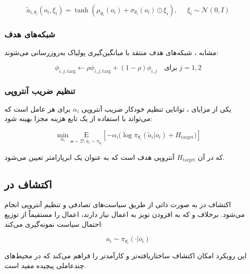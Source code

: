\begin{equation}
    \tilde{a}_{i,\theta_i}(o_i, \xi_i) = \tanh\left( \mu_{\theta_i}(o_i) + \sigma_{\theta_i}(o_i) \odot \xi_i \right), \;\;\;\;\; \xi_i \sim \mathcal{N}(0, I)
\end{equation}

\subsubsection{شبکه‌های هدف}

مشابه ، شبکه‌های هدف منتقد با میانگین‌گیری پولیاک به‌روزرسانی می‌شوند:

\begin{equation}
    \phi_{i,j,\text{targ}} \leftarrow \rho \phi_{i,j,\text{targ}} + (1 - \rho) \phi_{i,j} \quad \text{برای } j=1,2
\end{equation}

\subsubsection{تنظیم ضریب آنتروپی}

یکی از مزایای ، توانایی تنظیم خودکار ضریب آنتروپی $\alpha_i$ برای هر عامل است که می‌تواند با استفاده از یک تابع هزینه مجزا بهینه شود:

\begin{equation}
    \min_{\alpha_i} \underset{\boldsymbol{o} \sim \mathcal{D}, \tilde{a}_i \sim \pi_{\theta_i}}{\mathrm{E}}\left[ -\alpha_i \Big(\log \pi_{\theta_i}(\tilde{a}_i|o_i) + H_{\text{target}} \Big) \right]
\end{equation}

که در آن $H_{\text{target}}$ آنتروپی هدف است که به عنوان یک ابرپارامتر تعیین می‌شود.

\subsection{اکتشاف در }

اکتشاف در  به صورت ذاتی از طریق سیاست‌های تصادفی و تنظیم آنتروپی انجام می‌شود. برخلاف  و  که به افزودن نویز به اعمال نیاز دارند،  اعمال را مستقیماً از توزیع احتمال سیاست نمونه‌گیری می‌کند:

\begin{equation}
    a_i \sim \pi_{\theta_i}(\cdot|o_i)
\end{equation}

این رویکرد امکان اکتشاف ساختاریافته‌تر و کارآمدتر را فراهم می‌کند که در محیط‌های چند­عاملی پیچیده مفید است.

